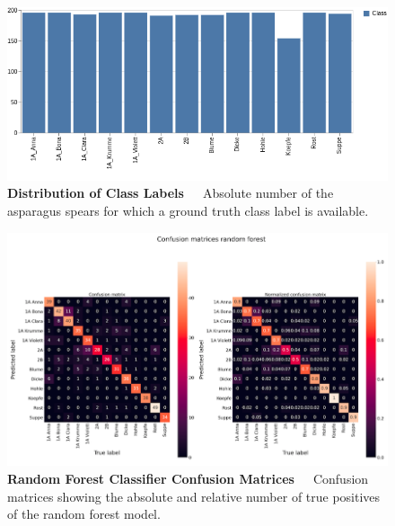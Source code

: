 \begin{figure}[!htb]
    \centering
    \includegraphics[scale=0.55]{Figures/chapter04/ftl_visualization.png}
    \decoRule
    \caption[Distribution of Class Labels]{\textbf{Distribution of Class Labels}~~~Absolute number of the asparagus spears for which a ground truth class label is available.}
    \label{fig:FeatureToLabelVisualization}
\end{figure}

\begin{figure}[!htb]
    \centering
    \includegraphics[scale=0.4]{Figures/chapter04/ftl_confusion_recall_random_forest.png}
    \decoRule
    \caption[Random Forest Classifier Confusion Matrices]{\textbf{Random Forest Classifier Confusion Matrices}~~~Confusion matrices showing the absolute and relative number of true positives of the random forest model.}
    \label{fig:FeatureToLabelRandomForest}
\end{figure}



